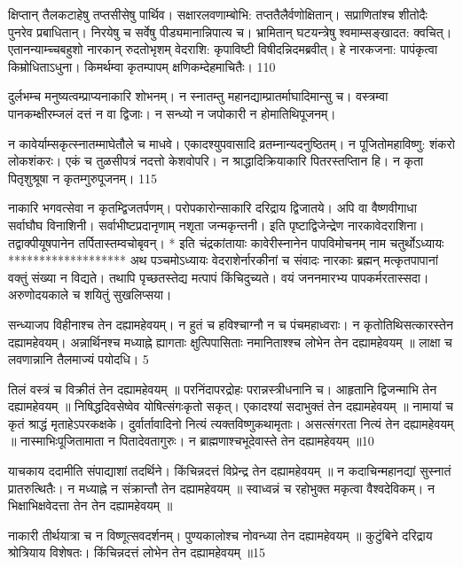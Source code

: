 क्षिप्तान् तैलकटाहेषु तप्तसीसेषु पार्थिव।
सक्षारलवणाम्बोभि: तप्ततैलैर्वणोक्षितान्।
सप्राणितांश्च शीतोदैः पुनरेव प्रबाधितान्।
निरयेषु च सर्वेषु पीड्यमानान्निपात्य च।
भ्रामितान् घटयन्त्रेषु श्वमाम्सङ्खादत: क्वचित्।
एतानन्याम्च्चबहुशो नारकान् रुदतोभृशम् वेदराशि: कृपाविष्टी विषीदन्निदमब्रवीत्।
हे नारकजना: पापंकृत्वा किम्रोधिताऽधुना।
किमर्थम्वा कृतम्पापम् क्षणिकम्देहमाचितैः।
110

दुर्लभम्च मनुष्यत्वम्प्राप्यनाकारि शोभनम्।
न स्नातम्तु महानद्याम्प्रातर्माघादिमान्सु च।
वस्त्रम्वा पानकम्क्षीरम्जलं दत्तं न वा द्विजाः।
न सन्ध्यो न जपोकारी न होमातिथिपूजनम्।


न कावेर्याम्सकृत्स्नातम्माघेतौले च माधवे।
एकादश्युपवासादि व्रतम्नान्यदनुष्ठितम्।
न पूजितोमहाविष्णु: शंकरो लोकशंकरः।
एकं च तुळसीपत्रं नदत्तो केशवोपरि।
न श्राद्धादिक्रियाकारि पितरस्तप्तिान हि।
न कृता पितृशुश्रूषा न कृतम्गुरुपूजनम्।
115

नाकारि भगवत्सेवा न कृतम्द्विजतर्पणम्।
परोपकारोन्साकारि दरिद्राय द्विजातये।
अपि वा वैष्णवीगाधा सर्वाघौघ विनाशिनी।
सर्वाभीष्टप्रदानृणाम् नशृता जन्मकृन्तनी।
इति पृष्टाद्विजेन्द्रेण नारकावेदराशिना।
तद्वाक्पीयूषपानेन तर्पितास्तम्वचोबृवन्।
* इति चंद्रकांतायाः कावेरीस्नानेन पापविमोचनम् नाम
चतुर्थोऽध्यायः
*******************
अथ पञ्चमोऽध्यायः वेदराशेर्नारकीनां च संवादः
नारकाः
ब्रह्मन् मत्कृतपापानां वक्तुं संख्या न विद्यते।
तथापि पृच्छतस्तेद्य मत्पापं किंचिदुच्यते।
वयं जननमारभ्य पापकर्मरतास्सदा।
अरुणोदयकाले च शयितुं सुखलिप्सया।



सन्ध्याजप विहीनाश्च तेन दह्यामहेवयम्।
न हुतं च हविश्चाग्नौ न च पंचमहाध्वराः।
न कृतोतिथिसत्कारस्तेन दह्यामहेवयम्।
अन्नार्थिनश्च मध्याह्ने ह्यागताः क्षुत्पिपासिताः नमानिताश्श्च लोभेन तेन दह्यामहेवयम् ॥ लाक्षा च लवणान्नानि तैलमाज्यं पयोदधि।
5

तिलं वस्त्रं च विक्रीतं तेन दह्यामहेवयम् ॥ परनिंदापरद्रोहः परान्नस्त्रीधनानि च।
आहृतानि द्विजन्माभि तेन दह्यामहेवयम् ॥ निषिद्धदिवसेष्वेव योषित्संगःकृतो सकृत्।
एकादश्यां सदाभुक्तं तेन दह्यामहेवयम् ॥ नामायां च कृतं श्राद्धं मृताहेऽपरकक्षके।
दुर्वार्तावादिनो नित्यं त्यक्तविष्णुकथामृताः।
असत्संगरता नित्यं तेन दह्यामहेवयम् ॥ नास्माभिःपूजितामाता न पितादेवतागुरुः।
न ब्राह्मणाश्चभूदेवास्ते तेन दह्यामहेवयम् ॥10

याचकाय ददामीति संपाद्याशां तदर्थिने।
किंचिन्नदत्तं विप्रेन्द्र तेन दह्यामहेवयम् ॥ न कदाचिन्महानद्यां सुस्नातं प्रातरुत्थितैः।
न मध्याह्ने न संक्रान्तौ तेन दह्यामहेवयम् ॥ स्वाध्वन्नं च रहोभुक्त मकृत्वा वैश्वदेविकम्।
न भिक्षाभिक्षवेदत्ता तेन तेन दह्यामहेवयम् ॥

नाकारी तीर्थयात्रा च न विष्णूत्सवदर्शनम्।
पुण्यकालोश्च नोवन्ध्या तेन दह्यामहेवयम् ॥ कुटुंबिने दरिद्राय श्रोत्रियाय विशेषतः।
किंचिन्नदत्तं लोभेन तेन दह्यामहेवयम् ॥15

